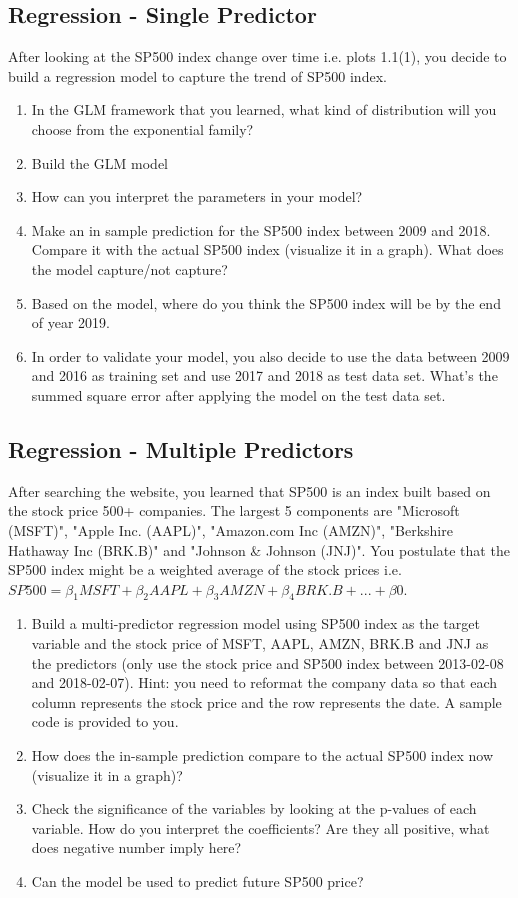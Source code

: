 \documentclass{article}
\begin{document}
\subsection{Regression - Single Predictor}

After looking at the SP500 index change over time i.e. plots 1.1(1), you decide to build a regression model to capture the trend of SP500 index. 
\begin{enumerate}[(1)]
\item In the GLM framework that you learned, what kind of distribution will you choose from the exponential family?
\item Build the GLM model
\item How can you interpret the parameters in your model?
\item Make an in sample prediction for the SP500 index between 2009 and 2018. Compare it with the actual SP500 index (visualize it in a graph). What does the model capture/not capture?
\item Based on the model, where do you think the SP500 index will be by the end of year 2019.
\item In order to validate your model, you also decide to use the data between 2009 and 2016 as training set and use 2017 and 2018 as test data set. What's the summed square error after applying the model on the test data set.  
\end{enumerate}

\subsection{Regression - Multiple Predictors}
After searching the website, you learned that SP500 is an index built based on the stock price 500+ companies. The largest 5 components are "Microsoft (MSFT)", "Apple Inc. (AAPL)", "Amazon.com Inc (AMZN)", "Berkshire Hathaway Inc (BRK.B)" and "Johnson \& Johnson (JNJ)". You postulate that the SP500 index might be a weighted average of the stock prices i.e. $SP500=\beta_1MSFT+\beta_2AAPL+\beta_3AMZN+\beta_4BRK.B+...+\beta0$. 

\begin{enumerate}[(1)]
\item Build a multi-predictor regression model using SP500 index as the target variable and the stock price of MSFT, AAPL, AMZN, BRK.B and JNJ as the predictors (only use the stock price and SP500 index between 2013-02-08 and 2018-02-07). Hint: you need to reformat the company data so that each column represents the stock price and the row represents the date. A sample code is provided to you.
\item How does the in-sample prediction compare to the actual SP500 index now (visualize it in a graph)?
\item Check the significance of the variables by looking at the p-values of each variable. How do you interpret the coefficients? Are they all positive, what does negative number imply here?
\item Can the model be used to predict future SP500 price?
\end{enumerate}
\end{document}
